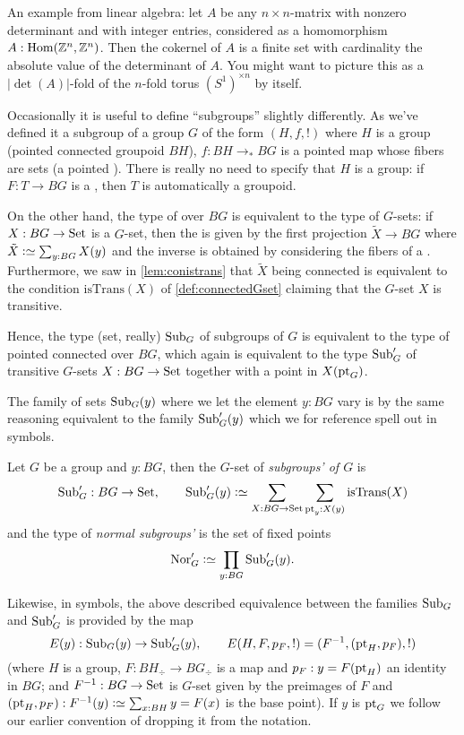 \begin{example}
  An example from linear algebra: let $A$ be any $n\times n$-matrix with nonzero determinant and with integer entries, considered as a homomorphism $A:\Hom(\ZZ^n,\ZZ^n)$.  Then the cokernel of $A$ is a finite set with cardinality the absolute value of the determinant of $A$.  You might want to picture this as a $|\det(A)|$-fold \covering of the $n$-fold torus $(S^1)^{\times n}$ by itself.
\end{example}




Occasionally it is useful to define ``subgroups'' slightly differently.
As we've defined it a subgroup of a group $G$ of the form $(H,f,!)$ where $H$ is a group (pointed connected groupoid  $BH$), $f:BH\to_* BG$ is a pointed map whose fibers are sets (a pointed \covering).  There is really no need to specify that $H$ is a group: if $F:T\to BG$ is a \covering, then $T$ is automatically a groupoid.  

On the other hand,  the type of \coverings over $BG$ is equivalent to the type of $G$-sets: if $X:BG\to\mathrm{Set}$ is a $G$-set, then the \covering is given by the first projection $\tilde X\to BG$ where $\tilde X\defequi\sum_{y:BG}X(y)$ and the inverse is obtained by considering the fibers of a \covering.  Furthermore, we saw in \cref{lem:conistrans} that $\tilde X$ being connected is equivalent to the condition $\mathrm{isTrans}(X)$ of \cref{def:connectedGset} claiming that the $G$-set $X$ is transitive. 

Hence, the type (set, really) $\mathrm{Sub}_G$ of subgroups of $G$ is equivalent to the type of pointed connected \coverings over $BG$, which again is equivalent to the type $\mathrm{Sub}_G'$ of transitive $G$-sets $X:BG\to\mathrm{Set}$ together with a point in $X(\mathrm{pt}_G)$.  

The family of sets $\mathrm{Sub}_G(y)$ where we let the element $y:BG$ vary is by the same reasoning equivalent to the family $\mathrm{Sub}_G'(y)$ which we for reference spell out in symbols.

\begin{definition}
  Let $G$ be a group and $y:BG$, then the $G$-set of \emph{subgroups' of $G$} is
  $$\typesubgroup_G':BG\to\Set,\qquad\typesubgroup_G'(y)\defequi\sum_{X:BG\to\Set}\sum_{\pt_y:X(y)}\mathrm{isTrans}(X)$$
and the type of \emph{normal subgroups'} is the set of fixed points
$$\typenormal_G'\defequi\prod_{y:BG}\typesubgroup_G'(y).$$
\end{definition}
Likewise, in symbols, the above described equivalence between the families $\mathrm{Sub}_G$ and $\mathrm{Sub}_G'$ is provided by the map 
$$E(y):\mathrm{Sub}_G(y)\to\mathrm{Sub}_G'(y),\qquad E(H,F,p_F,!)=(F^{-1}, (\mathrm{pt}_H,p_F),!)
$$
(where $H$ is a group, $F:BH_\div\to BG_\div$ is a map and $p_F:y=F(\mathrm{pt}_H)$ an identity in $BG$; and $F^{-1}:BG\to\mathrm{Set}$ is $G$-set given by the preimages of $F$ and $(\pt_H,p_F):F^{-1}(y)\defequi \sum_{x:BH}y=F(x)$ is the base point).  If $y$ is $\mathrm{pt}_G$ we follow our earlier convention of dropping it from the notation.


